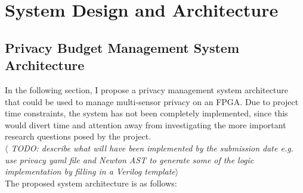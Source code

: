 \documentclass[12pt]{article}
\begin{document}
\section{System Design and Architecture}
  \subsection{Privacy Budget Management System Architecture}
    In the following section, I propose a privacy management system architecture that could be used to manage multi-sensor privacy on an FPGA. Due to project time constraints, the system has not been completely implemented, since this would divert time and attention away from investigating the more important research questions posed by the project.
    \\
    \textit{$\langle$ TODO: describe what will have been implemented by the submission date e.g. use privacy yaml file and Newton AST to generate some of the logic implementation by filling in a Verilog template$\rangle$}
    \\
    The proposed system architecture is as follows:
\end{document}
